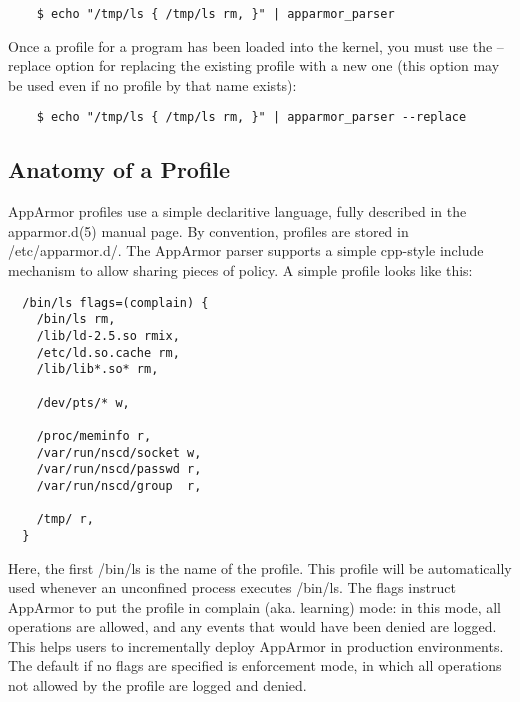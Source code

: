 \documentclass[a4paper]{article}
\renewcommand{\H}{\hspace{0pt}}
\begin{document}
\begin{small}
\begin{verbatim}
    $ echo "/tmp/ls { /tmp/ls rm, }" | apparmor_parser
\end{verbatim}
\end{small}

Once a profile for a program has been loaded into the kernel, you must
use the --replace option for replacing the existing profile with a new
one (this option may be used even if no profile by that name exists):

\begin{small}
\begin{verbatim}
    $ echo "/tmp/ls { /tmp/ls rm, }" | apparmor_parser --replace
\end{verbatim}
\end{small}

\subsection{Anatomy of a Profile}

AppArmor profiles use a simple declaritive language, fully described in
the apparmor.d(5) manual page. By convention, profiles are stored in
/etc/{\H}apparmor.d/. The AppArmor parser supports a simple cpp-style
include mechanism to allow sharing pieces of policy.  A simple profile
looks like this:

\begin{small}
\begin{verbatim}
  /bin/ls flags=(complain) {
    /bin/ls rm,
    /lib/ld-2.5.so rmix,
    /etc/ld.so.cache rm,
    /lib/lib*.so* rm,

    /dev/pts/* w,

    /proc/meminfo r,
    /var/run/nscd/socket w,
    /var/run/nscd/passwd r,
    /var/run/nscd/group  r,

    /tmp/ r,
  }
\end{verbatim}
\end{small}

Here, the first /bin/ls is the name of the profile. This profile will be
automatically used whenever an unconfined process executes /bin/ls.  The
flags instruct AppArmor to put the profile in complain (aka. learning)
mode: in this mode, all operations are allowed, and any events that
would have been denied are logged.  This helps users to incrementally
deploy AppArmor in production environments.  The default if no flags are
specified is enforcement mode, in which all operations not allowed by
the profile are logged and denied.
\end{document}
